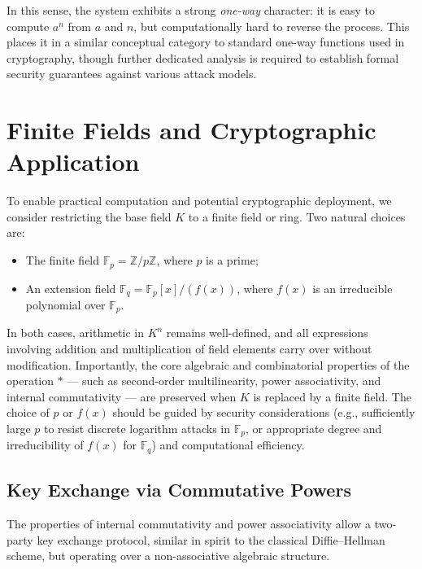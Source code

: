 \documentclass[12pt]{article}
\theoremstyle{definition}
\theoremstyle{plain}
\theoremstyle{remark}
\begin{document}
In this sense, the system exhibits a strong \emph{one-way} character: it is easy to compute \( a^n \) from \( a \) and \( n \), but computationally hard to reverse the process. This places it in a similar conceptual category to standard one-way functions used in cryptography, though further dedicated analysis is required to establish formal security guarantees against various attack models.

\section{Finite Fields and Cryptographic Application}

To enable practical computation and potential cryptographic deployment, we consider restricting the base field \( K \) to a finite field or ring. Two natural choices are:

\begin{itemize}
    \item The finite field \( \mathbb{F}_p = \mathbb{Z}/p\mathbb{Z} \), where \( p \) is a prime;
    \item An extension field \( \mathbb{F}_{q} = \mathbb{F}_p[x]/(f(x)) \), where \( f(x) \) is an irreducible polynomial over \( \mathbb{F}_p \).
\end{itemize}

In both cases, arithmetic in \( K^n \) remains well-defined, and all expressions involving addition and multiplication of field elements carry over without modification. Importantly, the core algebraic and combinatorial properties of the operation \( * \) — such as second-order multilinearity, power associativity, and internal commutativity — are preserved when \( K \) is replaced by a finite field. The choice of \( p \) or \( f(x) \) should be guided by security considerations (e.g., sufficiently large \( p \) to resist discrete logarithm attacks in \(\mathbb{F}_p\), or appropriate degree and irreducibility of \( f(x) \) for \(\mathbb{F}_q\)) and computational efficiency.

\subsection*{Key Exchange via Commutative Powers}

The properties of internal commutativity and power associativity allow a two-party key exchange protocol, similar in spirit to the classical Diffie–Hellman scheme, but operating over a non-associative algebraic structure.
\end{document}
